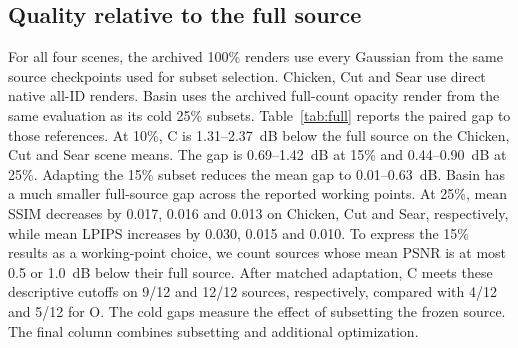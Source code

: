 \begin{table}[t]
\centering\small
\caption{Matched fine-tuning at 15\%, PSNR (dB). Each entry is a mean $\pm$ sample standard deviation over three source checkpoints. The last column summarizes within-checkpoint differences.}
\label{tab:finetune}
\end{table}


\FloatBarrier
\subsection{Quality relative to the full source}
\label{sec:full}
For all four scenes, the archived 100\% renders use every Gaussian from the same source checkpoints used for subset selection. Chicken, Cut and Sear use direct native all-ID renders. Basin uses the archived full-count opacity render from the same evaluation as its cold 25\% subsets. Table~\ref{tab:full} reports the paired gap to those references. At 10\%, C is 1.31--2.37~dB below the full source on the Chicken, Cut and Sear scene means. The gap is 0.69--1.42~dB at 15\% and 0.44--0.90~dB at 25\%. Adapting the 15\% subset reduces the mean gap to 0.01--0.63~dB. Basin has a much smaller full-source gap across the reported working points. At 25\%, mean SSIM decreases by 0.017, 0.016 and 0.013 on Chicken, Cut and Sear, respectively, while mean LPIPS increases by 0.030, 0.015 and 0.010. To express the 15\% results as a working-point choice, we count sources whose mean PSNR is at most 0.5 or 1.0~dB below their full source. After matched adaptation, C meets these descriptive cutoffs on 9/12 and 12/12 sources, respectively, compared with 4/12 and 5/12 for O. The cold gaps measure the effect of subsetting the frozen source. The final column combines subsetting and additional optimization.

\begin{table}[t]
\centering\small
\caption{Full-source PSNR and paired differences (full minus C, dB). Entries show mean $\pm$ sample standard deviation across the same three checkpoints per scene. The 100\% column uses the unpruned source checkpoint.}
\label{tab:full}
\end{table}

